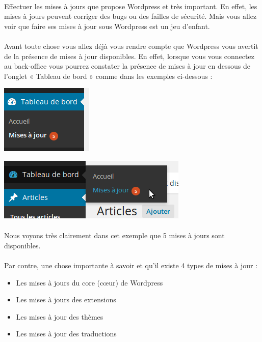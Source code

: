 \documentclass[10pt,a4paper]{article}
\begin{document}
\paragraph{}Effectuer les mises à jours que propose Wordpress et très important. En effet, les mises à jours peuvent corriger des bugs ou des failles de sécurité. Mais vous allez voir que faire ses mises à jour sous Wordpress est un jeu d'enfant.
\paragraph{}Avant toute chose vous allez déjà vous rendre compte que Wordpress vous avertit de la présence de mises à jour disponibles. En effet, lorsque vous vous connectez au back-office vous pourrez constater la présence de mises à jour en dessous de l'onglet « Tableau de bord » comme dans les exemples ci-dessous :
\begin{center}
\includegraphics[scale=0.5]{img/0050.png}
\end{center}
\begin{center}
\includegraphics[scale=0.5]{img/0051.png}
\end{center}
\paragraph{}Nous voyons très clairement dans cet exemple que 5 mises à jours sont disponibles.
\paragraph{}Par contre, une chose importante à savoir et qu'il existe 4 types de mises à jour :
\begin{itemize}
\item Les mises à jours du core (cœur) de Wordpress
\item Les mises à jours des extensions
\item Les mises à jour des thèmes
\item Les mises à jour des traductions
\end{itemize}
\end{document}
